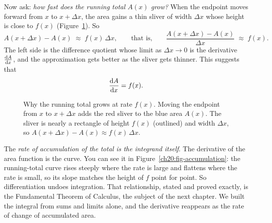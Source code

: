 Now ask: \emph{how fast does the running total $A(x)$ grow?} When the endpoint
moves forward from $x$ to $x+\Delta x$, the area gains a thin sliver of width
$\Delta x$ whose height is close to $f(x)$ (Figure~\ref{ch20:fig-sliver}). So
\[
  A(x+\Delta x) - A(x) \;\approx\; f(x)\,\Delta x,
  \qquad\text{that is,}\qquad
  \frac{A(x+\Delta x) - A(x)}{\Delta x} \;\approx\; f(x).
\]
The left side is the difference quotient whose limit as $\Delta x \to 0$ is the
derivative $\frac{\mathrm{d} A}{\mathrm{d} x}$, and the approximation gets better as the sliver gets
thinner. This suggests that
\[
  \frac{\mathrm{d} A}{\mathrm{d} x} = f(x).
\]

\begin{figure}[htbp]
\centering
{}
\caption{Why the running total grows at rate $f(x)$. Moving the endpoint from
$x$ to $x+\Delta x$ adds the red sliver to the blue area $A(x)$. The sliver is
nearly a rectangle of height $f(x)$ (outlined) and width $\Delta x$, so
$A(x+\Delta x)-A(x)\approx f(x)\,\Delta x$.}
\label{ch20:fig-sliver}
\end{figure}

The \emph{rate of accumulation of the total is the integrand itself}. The
derivative of the area function is the curve. You can see it in
Figure~\ref{ch20:fig-accumulation}: the running-total curve rises steeply
where the rate is large and flattens where the rate is small, so its
slope matches the height of $f$ point for point. So differentiation
undoes integration. That relationship, stated and proved exactly, is the
Fundamental Theorem of Calculus, the subject of the next chapter. We
built the integral from sums and limits alone, and the derivative reappears as
the rate of change of accumulated area.

